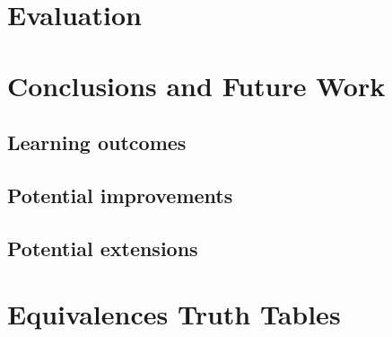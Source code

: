 \documentclass{report}
\begin{document}

\chapter{Evaluation}


\chapter{Conclusions and Future Work}
\section{Learning outcomes}
\section{Potential improvements}
\section{Potential extensions}


\begin{thebibliography}{9}
\end{thebibliography}


\appendix
\chapter{Equivalences Truth Tables}
\end{document}
